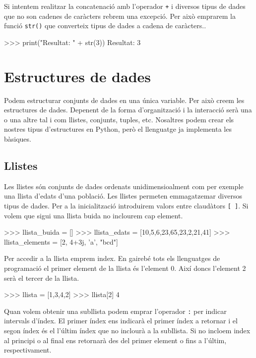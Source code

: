 Si intentem realitzar la concatenació amb l'operador {\tt +} i diversos tipus de dades que no son cadenes de caràcters rebrem una excepció. Per això emprarem la funció {\tt str()} que converteix tipus de dades a cadena de caràcters..

\begin{blockcode}
>>> print("Resultat: " + str(3))
Resultat: 3
\end{blockcode}	




\section{Estructures de dades}

Podem estructurar conjunts de dades en una única variable. Per això creem les estructures de dades. Depenent de la forma d'organització i la interacció serà una o una altre tal i com llistes, conjunts, tuples, etc. Nosaltres podem crear els nostres tipus d'estructures en Python, però el llenguatge ja implementa les bàsiques.




\subsection{Llistes}

Les llistes són conjunts de dades ordenats unidimensioalment com per exemple una llista d'edats d'una població. Les llistes permeten emmagatzemar diversos tipus de dades. Per a la inicialització introduirem valors entre claudàtors {\tt [ ]}. Si volem que sigui una llista buida no inclourem cap element.


\begin{blockcode}
>>> llista_buida = []
>>> llista_edats = [10,5,6,23,65,23,2,21,41]
>>> llista_elements = [2, 4+3j, 'a', "bcd"]
\end{blockcode}



Per accedir a la llista emprem index. En gairebé tots els llenguatges de programació el primer element de la llista és l'element 0. Així doncs l'element 2 serà el tercer de la llista.

\begin{blockcode}
>>> llista = [1,3,4,2]
>>> llista[2]
4
\end{blockcode}

Quan volem obtenir una subllista podem emprar l'operador {\tt :} per indicar intervals d'índex. El primer índex ens indicarà el primer índex a retornar i el segon índex és el l'últim índex que no inclourà a la subllista. Si no incloem index al principi o al final ens retornarà des del primer element o fins a l'últim, respectivament. 


